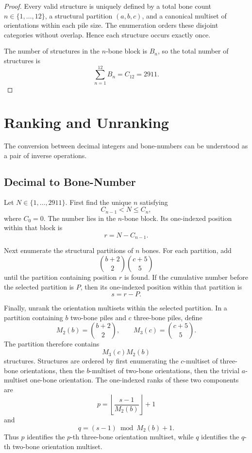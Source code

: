 \documentclass[11pt]{article}
\theoremstyle{remark}
\begin{document}
\begin{proof}
Every valid structure is uniquely defined by a total bone count \(n\in\{1,\ldots,12\}\),
a structural partition \((a,b,c)\), and a canonical multiset of
orientations within each pile size. The enumeration orders these disjoint
categories without overlap. Hence each structure occurs exactly once.

\bigskip
The number of structures in the \(n\)-bone block is \(B_n\), so the total number
of structures is
\[
\sum_{n=1}^{12}B_n=C_{12}=2911.
\]
\end{proof}

\section{Ranking and Unranking}

The conversion between decimal integers and bone-numbers can be understood as a
pair of inverse operations.

\subsection{Decimal to Bone-Number}

Let \(N\in\{1,\ldots,2911\}\). First find the unique \(n\) satisfying
\[
C_{n-1}<N\leq C_n,
\]
where \(C_0=0\). The number lies in the \(n\)-bone block. Its one-indexed position within that block is
\[
\boxed{
r=N-C_{n-1}.
}
\]

Next enumerate the structural partitions of \(n\) bones. For each partition, add
\[
\binom{b+2}{2}\binom{c+5}{5}
\]
until the partition containing position \(r\) is found. If the cumulative number before the selected partition is \(P\), then its one-indexed position within that partition is
\[
\boxed{
s=r-P.
}
\]

Finally, unrank the orientation multisets within the selected partition. In a partition containing \(b\) two-bone piles and \(c\) three-bone piles, define
\[
M_2(b)=\binom{b+2}{2},
\qquad
M_3(c)=\binom{c+5}{5}.
\]
The partition therefore contains
\[
M_3(c)M_2(b)
\]
structures. Structures are ordered by first enumerating the \(c\)-multiset of three-bone orientations, then the \(b\)-multiset of two-bone orientations, then the trivial \(a\)-multiset one-bone orientation. The one-indexed ranks of these two components are
\[
\boxed{
p=\left\lfloor\frac{s-1}{M_2(b)}\right\rfloor+1
}
\]
and
\[
\boxed{
q=(s-1)\bmod M_2(b)+1.
}
\]
Thus \(p\) identifies the \(p\)-th three-bone orientation multiset, while \(q\) identifies the \(q\)-th two-bone orientation multiset.
\end{document}
